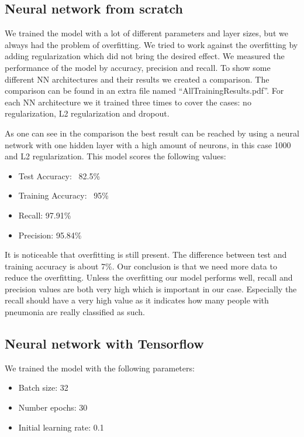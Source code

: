 \documentclass{article}
\begin{document}
\subsection{Neural network from scratch}
\label{sec:neural_network_from_scratch}

We trained the model with a lot of different parameters and layer sizes, 
but we always had the problem of overfitting. 
We tried to work against the overfitting by adding regularization which did not bring the desired effect. 
We measured the performance of the model by accuracy, precision and recall. 
To show some different NN architectures and their results we created a comparison. 
The comparison can be found in an extra file named ``AllTrainingResults.pdf''. 
For each NN architecture we it trained three times to cover the cases: no regularization, L2 regularization and dropout.

As one can see in the comparison the best result can be reached by using a neural network 
with one hidden layer with a high amount of neurons, in this case 1000 and L2 regularization.
This model scores the following values:
\begin{itemize}
  \item Test Accuracy: ~82.5\%
  \item Training Accuracy: ~95\%
  \item Recall: 97.91\%
  \item Precision: 95.84\%
\end{itemize}

It is noticeable that overfitting is still present. The difference between test and training accuracy is about 7\%. 
Our conclusion is that we need more data to reduce the overfitting.
Unless the overfitting our model performs well, recall and precision values are both very high which is important in our case. 
Especially the recall should have a very high value as it indicates how many people with pneumonia are really classified as such.

\subsection{Neural network with Tensorflow}
\label{sec:neural_network_with_tensorflow}

We trained the model with the following parameters:
\begin{itemize}
  \item Batch size: 32
  \item Number epochs: 30
  \item Initial learning rate: 0.1
\end{itemize}
\end{document}
